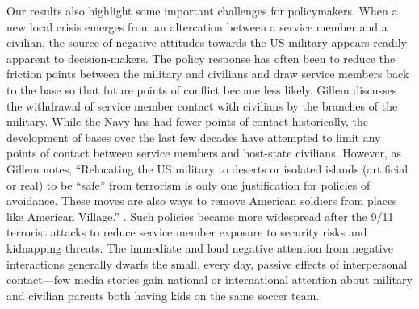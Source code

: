 

Our results also highlight some important challenges for policymakers. When a new local crisis emerges from an altercation between a service member and a civilian, the source of negative attitudes towards the US military appears readily apparent to decision-makers. The policy response has often been to reduce the friction points between the military and civilians and draw service members back to the base so that future points of conflict become less likely. Gillem discusses the withdrawal of service member contact with civilians by the branches of the military.\autocite{Gillem2007} While the Navy has had fewer points of contact historically, the development of bases over the last few decades have attempted to limit any points of contact between service members and host-state civilians. However, as Gillem notes, ``Relocating the US military to deserts or isolated islands (artificial or real) to be ``safe'' from terrorism is only one justification for policies of avoidance. These moves are also ways to remove American soldiers from places like American Village.'' \autocite[p. 262]{Gillem2007}. Such policies became more widespread after the 9/11 terrorist attacks to reduce service member exposure to security risks and kidnapping threats. The immediate and loud negative attention from negative interactions generally dwarfs the small, every day, passive effects of interpersonal contact---few media stories gain national or international attention about military and civilian parents both having kids on the same soccer team. 


